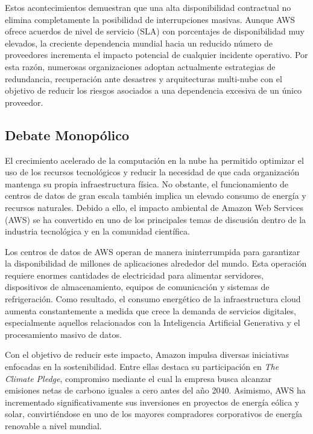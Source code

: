 \documentclass[12pt,a4paper]{article}
\begin{document}
Estos acontecimientos demuestran que una alta disponibilidad contractual no elimina completamente la posibilidad de interrupciones masivas. Aunque AWS ofrece acuerdos de nivel de servicio (SLA) con porcentajes de disponibilidad muy elevados, la creciente dependencia mundial hacia un reducido número de proveedores incrementa el impacto potencial de cualquier incidente operativo. Por esta razón, numerosas organizaciones adoptan actualmente estrategias de redundancia, recuperación ante desastres y arquitecturas multi-nube con el objetivo de reducir los riesgos asociados a una dependencia excesiva de un único proveedor.\parencite{aws_network_2021}


\subsection{Debate Monopólico}
El crecimiento acelerado de la computación en la nube ha permitido optimizar el uso de los recursos tecnológicos y reducir la necesidad de que cada organización mantenga su propia infraestructura física. No obstante, el funcionamiento de centros de datos de gran escala también implica un elevado consumo de energía y recursos naturales. Debido a ello, el impacto ambiental de Amazon Web Services (AWS) se ha convertido en uno de los principales temas de discusión dentro de la industria tecnológica y en la comunidad científica.\parencite{climate_pledge_2019}

Los centros de datos de AWS operan de manera ininterrumpida para garantizar la disponibilidad de millones de aplicaciones alrededor del mundo. Esta operación requiere enormes cantidades de electricidad para alimentar servidores, dispositivos de almacenamiento, equipos de comunicación y sistemas de refrigeración. Como resultado, el consumo energético de la infraestructura cloud aumenta constantemente a medida que crece la demanda de servicios digitales, especialmente aquellos relacionados con la Inteligencia Artificial Generativa y el procesamiento masivo de datos.\parencite{climate_pledge_2019}

Con el objetivo de reducir este impacto, Amazon impulsa diversas iniciativas enfocadas en la sostenibilidad. Entre ellas destaca su participación en \textit{The Climate Pledge}, compromiso mediante el cual la empresa busca alcanzar emisiones netas de carbono iguales a cero antes del año 2040. Asimismo, AWS ha incrementado significativamente sus inversiones en proyectos de energía eólica y solar, convirtiéndose en uno de los mayores compradores corporativos de energía renovable a nivel mundial.\parencite{climate_pledge_2019}
\end{document}
